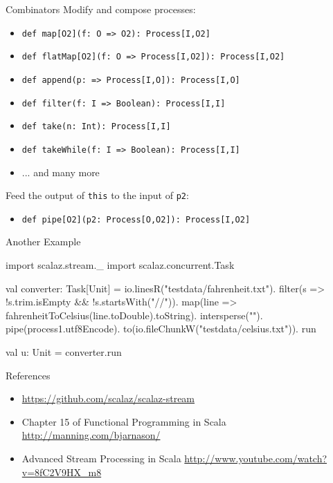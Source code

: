 \documentclass[hyperref={colorlinks=true,urlcolor=blue}]{beamer}
\begin{document}
\begin{frame}{Combinators}
  Modify and compose processes:
  \begin{itemize}
    \item \texttt{def map[O2](f: O => O2): Process[I,O2]}
    \item \texttt{def flatMap[O2](f: O => Process[I,O2]): Process[I,O2]}
    \item \texttt{def append(p: => Process[I,O]): Process[I,O]}
    \item \texttt{def filter(f: I => Boolean): Process[I,I]}
    \item \texttt{def take(n: Int): Process[I,I]}
    \item \texttt{def takeWhile(f: I => Boolean): Process[I,I]}
    \item ... and many more
  \end{itemize}
  
  Feed the output of \texttt{this} to the input of \texttt{p2}: 
  \begin{itemize}
    \item \texttt{def pipe[O2](p2: Process[O,O2]): Process[I,O2]}
  \end{itemize}
\end{frame}

\begin{frame}[fragile]{Another Example}
  \begin{code}
import scalaz.stream._
import scalaz.concurrent.Task

val converter: Task[Unit] =
  io.linesR("testdata/fahrenheit.txt").
     filter(s =>
       !s.trim.isEmpty && !s.startsWith("//")).
     map(line =>
       fahrenheitToCelsius(line.toDouble).toString).
     intersperse("\n").
     pipe(process1.utf8Encode).
     to(io.fileChunkW("testdata/celsius.txt")).
     run

val u: Unit = converter.run 
  \end{code}
\end{frame}

\begin{frame}{References}
  \begin{itemize}
   \item \url{https://github.com/scalaz/scalaz-stream}
   \item Chapter 15 of Functional Programming in Scala
     \url{http://manning.com/bjarnason/}
   \item Advanced Stream Processing in Scala
     \url{http://www.youtube.com/watch?v=8fC2V9HX_m8}
  \end{itemize}
\end{frame}
\end{document}
